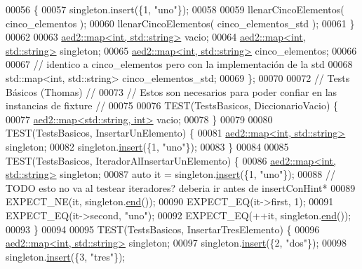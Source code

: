 \begin{DoxyCode}
00056     \{
00057         singleton.insert(\{1, \textcolor{stringliteral}{"uno"}\});
00058 
00059         llenarCincoElementos( cinco\_elementos );
00060         llenarCincoElementos( cinco\_elementos\_std );
00061     \}
00062 
00063     \hyperlink{classaed2_1_1map}{aed2::map<int, std::string>} vacio;
00064     \hyperlink{classaed2_1_1map}{aed2::map<int, std::string>} singleton;
00065     \hyperlink{classaed2_1_1map}{aed2::map<int, std::string>} cinco\_elementos;
00066 
00067     \textcolor{comment}{// identico a cinco\_elementos pero con la implementación de la std}
00068     std::map<int, std::string> cinco\_elementos\_std;
00069 \};
00070 
00072 \textcolor{comment}{// Tests Básicos (Thomas)                                               //}
00073 \textcolor{comment}{// Estos son necesarios para poder confiar en las instancias de fixture //}
00075 \textcolor{comment}{}
00076 TEST(TestsBasicos, DiccionarioVacio) \{
00077     \hyperlink{classaed2_1_1map}{aed2::map<std::string, int>} vacio;
00078 \}
00079 
00080 TEST(TestsBasicos, InsertarUnElemento) \{
00081     \hyperlink{classaed2_1_1map}{aed2::map<int, std::string>} singleton;
00082     singleton.\hyperlink{classaed2_1_1map_a6941cde9a79c27f054b5c97a587a1854_a6941cde9a79c27f054b5c97a587a1854}{insert}(\{1, \textcolor{stringliteral}{"uno"}\});
00083 \}
00084 
00085 TEST(TestsBasicos, IteradorAlInsertarUnElemento) \{
00086     \hyperlink{classaed2_1_1map}{aed2::map<int, std::string>} singleton;
00087     \textcolor{keyword}{auto} it = singleton.\hyperlink{classaed2_1_1map_a6941cde9a79c27f054b5c97a587a1854_a6941cde9a79c27f054b5c97a587a1854}{insert}(\{1, \textcolor{stringliteral}{"uno"}\});
00088     \textcolor{comment}{// TODO esto no va al testear iteradores? deberia ir antes de insertConHint*}
00089     EXPECT\_NE(it, singleton.\hyperlink{classaed2_1_1map_a76023e6a56cb625513e1b5ea028bf983_a76023e6a56cb625513e1b5ea028bf983}{end}());
00090     EXPECT\_EQ(it->first, 1);
00091     EXPECT\_EQ(it->second, \textcolor{stringliteral}{"uno"});
00092     EXPECT\_EQ(++it, singleton.\hyperlink{classaed2_1_1map_a76023e6a56cb625513e1b5ea028bf983_a76023e6a56cb625513e1b5ea028bf983}{end}());
00093 \}
00094 
00095 TEST(TestsBasicos, InsertarTresElemento) \{
00096     \hyperlink{classaed2_1_1map}{aed2::map<int, std::string>} singleton;
00097     singleton.\hyperlink{classaed2_1_1map_a6941cde9a79c27f054b5c97a587a1854_a6941cde9a79c27f054b5c97a587a1854}{insert}(\{2, \textcolor{stringliteral}{"dos"}\});
00098     singleton.\hyperlink{classaed2_1_1map_a6941cde9a79c27f054b5c97a587a1854_a6941cde9a79c27f054b5c97a587a1854}{insert}(\{3, \textcolor{stringliteral}{"tres"}\});

\end{DoxyCode}
